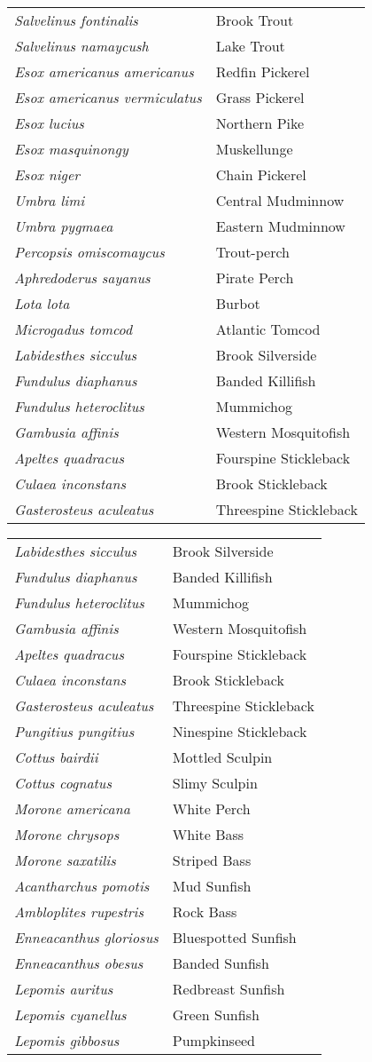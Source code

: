 \documentclass[11pt]{article}
\begin{document}
\vspace{\baselineskip}

%
\textbf{\Student}

\begin{tabular}{@{}L{3in}L{3in}@{}}
\textit{Salvelinus fontinalis} & Brook Trout\tabularnewline
\textit{Salvelinus namaycush} & Lake Trout\tabularnewline
\textit{Esox americanus americanus} & Redfin Pickerel\tabularnewline
\textit{Esox americanus vermiculatus} & Grass Pickerel\tabularnewline
\textit{Esox lucius} & Northern Pike\tabularnewline
\textit{Esox masquinongy} & Muskellunge\tabularnewline
\textit{Esox niger} & Chain Pickerel\tabularnewline
\textit{Umbra limi} & Central Mudminnow\tabularnewline
\textit{Umbra pygmaea} & Eastern Mudminnow\tabularnewline
\textit{Percopsis omiscomaycus}	& Trout-perch\tabularnewline
\textit{Aphredoderus sayanus} & Pirate Perch\tabularnewline
\textit{Lota lota} & Burbot\tabularnewline
\textit{Microgadus tomcod} & Atlantic Tomcod\tabularnewline
\textit{Labidesthes sicculus} & Brook Silverside\tabularnewline
\textit{Fundulus diaphanus} & Banded Killifish\tabularnewline
\textit{Fundulus heteroclitus} & Mummichog\tabularnewline
\textit{Gambusia affinis} & Western Mosquitofish\tabularnewline
\textit{Apeltes quadracus} & Fourspine Stickleback\tabularnewline
\textit{Culaea inconstans} & Brook Stickleback\tabularnewline
\textit{Gasterosteus aculeatus} & Threespine Stickleback\tabularnewline
\end{tabular}

\newpage

\vspace{\baselineskip}

%
\textbf{\Student}

\begin{tabular}{@{}L{3in}L{3in}@{}}
\textit{Labidesthes sicculus} & Brook Silverside\tabularnewline
\textit{Fundulus diaphanus} & Banded Killifish\tabularnewline
\textit{Fundulus heteroclitus} & Mummichog\tabularnewline
\textit{Gambusia affinis} & Western Mosquitofish\tabularnewline
\textit{Apeltes quadracus} & Fourspine Stickleback\tabularnewline
\textit{Culaea inconstans} & Brook Stickleback\tabularnewline
\textit{Gasterosteus aculeatus} & Threespine Stickleback\tabularnewline
\textit{Pungitius pungitius} & Ninespine Stickleback\tabularnewline
\textit{Cottus bairdii} & Mottled Sculpin\tabularnewline
\textit{Cottus cognatus} & Slimy Sculpin\tabularnewline
\textit{Morone americana} & White Perch\tabularnewline
\textit{Morone chrysops} & White Bass\tabularnewline
\textit{Morone saxatilis} & Striped Bass\tabularnewline
\textit{Acantharchus pomotis} & Mud Sunfish\tabularnewline
\textit{Ambloplites rupestris} & Rock Bass\tabularnewline
\textit{Enneacanthus gloriosus} & Bluespotted Sunfish\tabularnewline
\textit{Enneacanthus obesus} & Banded Sunfish\tabularnewline
\textit{Lepomis auritus} & Redbreast Sunfish\tabularnewline
\textit{Lepomis cyanellus} & Green Sunfish\tabularnewline
\textit{Lepomis gibbosus} & Pumpkinseed\tabularnewline
\end{tabular}
\end{document}
